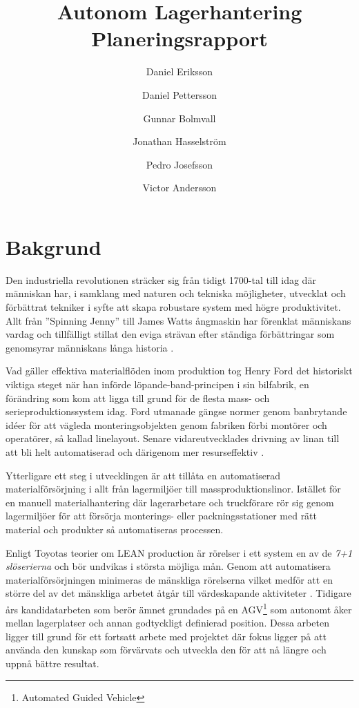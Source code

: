 \documentclass[a4paper,11pt]{article}
\author{Daniel Eriksson \and Daniel Pettersson \and Gunnar Bolmvall 
\and Jonathan Hasselström \and Pedro Josefsson \and Victor Andersson}
\title{Autonom Lagerhantering \\ Planeringsrapport}
\begin{document}
\maketitle


\section{Bakgrund}
Den industriella revolutionen sträcker sig från tidigt 1700-tal till idag
där människan har, i samklang med naturen och tekniska möjligheter,
utvecklat och förbättrat tekniker i syfte att skapa robustare system med
högre produktivitet. Allt från ''Spinning Jenny'' till James Watts ångmaskin
har förenklat människans vardag och tillfälligt stillat den eviga strävan
efter ständiga förbättringar som genomsyrar människans långa historia
\cite{organisationochorganisering}.

Vad gäller effektiva materialflöden inom produktion tog Henry Ford det
historiskt viktiga steget när han införde löpande-band-principen i sin
bilfabrik, en förändring som kom att ligga till grund för de flesta mass-
och serieproduktionssystem idag. Ford utmanade gängse normer genom
banbrytande idéer för att vägleda monteringsobjekten genom fabriken förbi
montörer och operatörer, så kallad linelayout. Senare vidareutvecklades
drivning av linan till att bli helt automatiserad och därigenom mer
resurseffektiv \cite{organisationochorganisering}.

Ytterligare ett steg i utvecklingen är att tillåta en automatiserad
materialförsörjning i allt från lagermiljöer till massproduktionslinor.
Istället för en manuell materialhantering där lagerarbetare och truckförare
rör sig genom lagermiljöer för att försörja monterings- eller
packningsstationer med rätt material och produkter så automatiseras
processen.

Enligt Toyotas teorier om LEAN production är rörelser i ett system en av de
\emph{7+1 slöserierna} och bör undvikas i största möjliga mån. Genom att
automatisera materialförsörjningen minimeras de mänskliga rörelserna vilket
medför att en större del av det mänskliga arbetet åtgår till värdeskapande
aktiviteter \cite{organisationochorganisering}. Tidigare års
kandidatarbeten som berör ämnet grundades på en AGV\footnote{Automated
Guided Vehicle} som autonomt åker mellan lagerplatser och annan godtyckligt
definierad position. Dessa arbeten ligger till grund för ett fortsatt
arbete med projektet där fokus ligger på att använda den kunskap som
förvärvats och utveckla den för att nå längre och uppnå bättre resultat.
 
\end{document}

